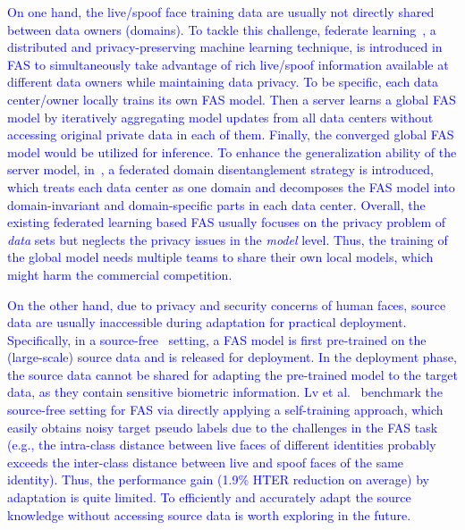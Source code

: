 \documentclass[10pt,journal,compsoc]{IEEEtran}
\begin{document}
 \textcolor{blue}{On one hand, the live/spoof face training data are usually not directly shared between data owners (domains). To tackle this challenge, federate learning~\cite{mcmahan2017communication}, a distributed and privacy-preserving machine learning technique, is introduced in FAS to simultaneously take advantage of rich live/spoof information available at different data owners while maintaining data privacy. To be specific, each data center/owner locally trains its own FAS model. Then a server learns a global FAS model by iteratively aggregating model updates from all data centers without accessing original private data in each of them. Finally, the converged global FAS model would be utilized for inference. To enhance the generalization ability of the server model, in~\cite{shao2021federated}, a federated domain disentanglement strategy is introduced, which treats each data center as one domain and decomposes the FAS model into domain-invariant and domain-specific parts in each data center. Overall, the existing federated learning based FAS usually focuses on the privacy problem of \textit{data} sets but neglects the privacy issues in the \textit{model} level. Thus, the training of the global model needs multiple teams to share their own local models, which might harm the commercial competition.}   


 \textcolor{blue}{On the other hand, due to privacy and security concerns of human faces, source data are usually inaccessible during adaptation for practical deployment. Specifically, in a source-free~\cite{kundu2020universal} setting, a FAS model is first pre-trained on the (large-scale) source data and is released for deployment. In the deployment phase, the source data cannot be shared for adapting the pre-trained model to the target data, as they contain sensitive biometric information. Lv et al.~\cite{lv2021combining} benchmark the source-free setting for FAS via directly applying a self-training approach, which easily obtains noisy target pseudo labels due to the challenges in the FAS task (e.g., the intra-class distance between live faces of different identities probably exceeds the inter-class distance between live and spoof faces of the same identity). Thus, the performance gain (1.9\% HTER reduction on average) by adaptation is quite limited. To efficiently and accurately adapt the source knowledge without accessing source data is worth exploring in the future. }  



\end{document}

